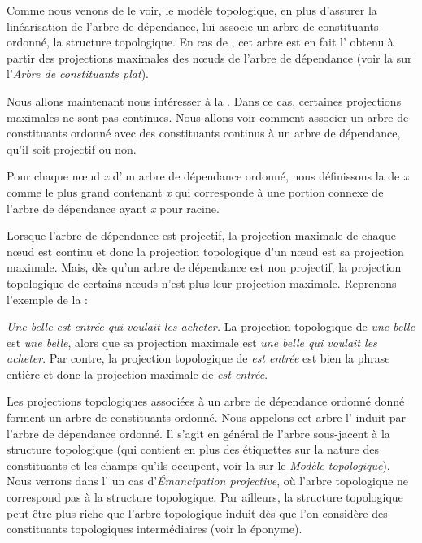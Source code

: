 Comme nous venons de le voir, le modèle topologique, en plus d’assurer la linéarisation de l’arbre de dépendance, lui associe un arbre de constituants ordonné, la structure topologique. En cas de , cet arbre est en fait l’ obtenu à partir des projections maximales des nœuds de l’arbre de dépendance (voir la  sur l'\textit{Arbre de constituants plat}).

Nous allons maintenant nous intéresser à la . Dans ce cas, certaines projections maximales ne sont pas continues. Nous allons voir comment associer un arbre de constituants ordonné avec des constituants continus à un arbre de dépendance, qu’il soit projectif ou non.

{Pour chaque nœud \textit{x} d’un arbre de dépendance ordonné, nous définissons la  de \textit{x} comme le plus grand  contenant \textit{x} qui corresponde à une portion connexe de l’arbre de dépendance ayant \textit{x} pour racine.}

Lorsque l’arbre de dépendance est projectif, la projection maximale de chaque nœud est continu et donc la projection topologique d’un nœud est sa projection maximale. Mais, dès qu’un arbre de dépendance est non projectif, la projection topologique de certains nœuds n’est plus leur projection maximale. Reprenons l’exemple  de la  :

\ea\label{ex:belle}
    \textit{{Une belle est entrée qui voulait les acheter}.}
\z
La projection topologique de \textit{une belle} est \textit{une belle}, alors que sa projection maximale est \textit{une belle qui voulait les acheter}. Par contre, la projection topologique de \textit{est entrée} est bien la phrase entière et donc la projection maximale de \textit{est entrée}.

Les projections topologiques associées à un arbre de dépendance ordonné don\-né forment un arbre de constituants ordonné. Nous appelons cet arbre l’ induit par l’arbre de dépendance ordonné. Il s'agit en général de l'arbre sous-jacent à la structure topologique (qui contient en plus des étiquettes sur la nature des constituants et les champs qu'ils occupent, voir la  sur le {\textit{Modèle topologique}}). Nous verrons dans l' un cas d'\textit{Émanci\-pa\-tion projective}, où l'arbre topologique ne correspond pas à la structure topologique. Par ailleurs, la structure topologique peut être plus riche que l'arbre topologique induit dès que l'on considère des constituants topologiques intermédiaires (voir la  éponyme).

